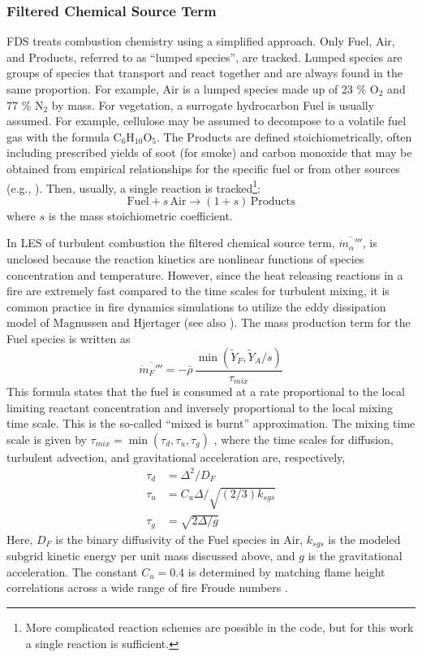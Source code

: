 \documentclass[journal,article,atmosphere,submit,moreauthors,pdftex]{Definitions/mdpi}
\renewcommand{\C}{\mathrm{C}}
\renewcommand{\H}{\mathrm{H}}
\renewcommand{\O}{\mathrm{O}}
\begin{document}
\subsubsection{Filtered Chemical Source Term}

FDS treats combustion chemistry using a simplified approach.  Only Fuel, Air, and Products, referred to as ``lumped species'', are tracked.  Lumped species are groups of species that transport and react together and are always found in the same proportion.  For example, Air is a lumped species made up of 23 \% O$_2$ and 77 \% N$_2$ by mass.  For vegetation, a surrogate hydrocarbon Fuel is usually assumed.  For example, cellulose may be assumed to decompose to a volatile fuel gas with the formula $\C_{6} \H_{10} \O_{5}$.  The Products are defined stoichiometrically, often including prescribed yields of soot (for smoke) and carbon monoxide that may be obtained from empirical relationships for the specific fuel or from other sources (e.g., \cite{SFPE:Mulholland}).  Then, usually, a single reaction is tracked\footnote{More complicated reaction schemes are possible in the code, but for this work a single reaction is sufficient.}:
\begin{equation}
\mathrm{Fuel} + s \, \mathrm{Air} \rightarrow (1+s) \,\mathrm{Products}
\end{equation}
where $s$ is the mass stoichiometric coefficient.  

In LES of turbulent combustion the filtered chemical source term, $\overline{\dot{m}_\alpha'''}$, is unclosed because the reaction kinetics are nonlinear functions of species concentration and temperature.  However, since the heat releasing reactions in a fire are extremely fast compared to the time scales for turbulent mixing, it is common practice in fire dynamics simulations to utilize the eddy dissipation model of Magnussen and Hjertager \cite{Magnussen:1} (see also \cite{Poinsot:TNC}).  The mass production term for the Fuel species is written as
\begin{equation}
\overline{\dot{m}_{F}'''} = -\bar{\rho} \,\frac{\min(\tilde{Y}_F,\tilde{Y}_A/s)}{\tau_{mix}}
\end{equation}
This formula states that the fuel is consumed at a rate proportional to the local limiting reactant concentration and inversely proportional to the local mixing time scale.  This is the so-called ``mixed is burnt'' approximation.  The mixing time scale is given by $\tau_{mix} = \min(\tau_d, \tau_u,\tau_g)$ \cite{McDermott:2011}, where the time scales for diffusion, turbulent advection, and gravitational acceleration are, respectively,
\begin{align}
\tau_d &= \Delta^2/D_F \\
\tau_u &= C_u \Delta / \sqrt{(2/3)k_{sgs}} \\
\tau_g &= \sqrt{2\Delta/g}
\end{align}
Here, $D_F$ is the binary diffusivity of the Fuel species in Air, $k_{sgs}$ is the modeled subgrid kinetic energy per unit mass discussed above, and $g$ is the gravitational acceleration. The constant $C_u=0.4$ is determined by matching flame height correlations across a wide range of fire Froude numbers \cite{FDS_Validation_Guide}.
\end{document}
